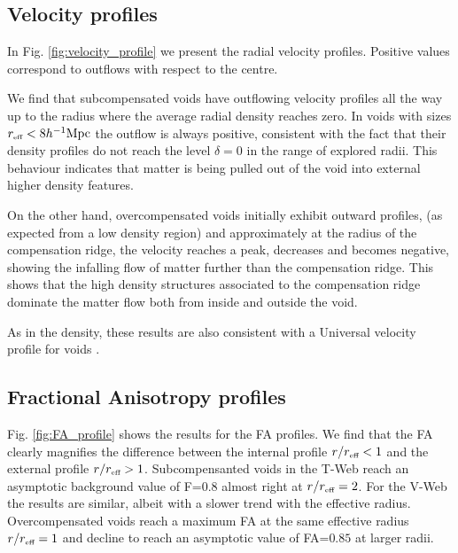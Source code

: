 \documentclass[a4,useAMS,usenatbib,usegraphicx]{mn2e}
\newcommand{\hMpc}{{\ifmmode{h^{-1}{\rm Mpc}}\else{$h^{-1}$Mpc}\fi}}
\newcommand{\reff}{{\ifmmode{r_{\mbox{\tiny eff}}}\else{$r_{\mbox{\tiny eff}}$}\fi}}
\begin{document}
\subsection{Velocity profiles}
\label{subsec:velocity_voids}

In Fig. \ref{fig:velocity_profile} we present the radial velocity
profiles. 
Positive values correspond to outflows with respect to the centre. 


We find that subcompensated voids have outflowing velocity profiles
all the way up to the radius where the average radial
density reaches zero.
In voids with sizes $\reff <8\hMpc$ the outflow is always
positive, consistent with the fact that their density profiles do not
reach the level $\delta=0$ in the range of explored radii.
This behaviour indicates that matter is being pulled out of the void
into external higher density features.


On the other hand, overcompensated voids initially exhibit outward
profiles, (as expected from a low density region) and approximately at
the radius of the compensation ridge, the velocity reaches a peak,
decreases and becomes negative, showing the infalling flow of matter
further than the compensation ridge. 
This shows that the high density structures associated to the
compensation ridge dominate the matter flow both from inside and
outside the void.

As in the density, these results are also consistent with a Universal
velocity profile for voids \citep{Paz13, Hamaus14}.

\subsection{Fractional Anisotropy profiles}
\label{subsec:FA_voids}



Fig. \ref{fig:FA_profile} shows the results for the FA profiles.
We find that the FA clearly magnifies the difference between the
internal profile $r/\reff <1$ and the external profile $r/\reff >1$. 
Subcompensanted voids in the T-Web reach an asymptotic background
value of F=$0.8$ almost right at $r/\reff =2$. 
For the V-Web the results are similar, albeit with a slower trend with
the effective radius. 
Overcompensated voids reach a maximum FA at the same effective radius
$r/\reff =1$ and decline to reach an asymptotic value of FA=$0.85$
at larger radii.
\end{document}
